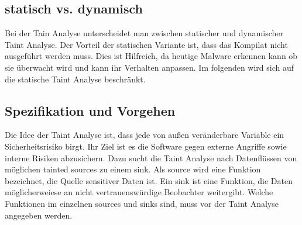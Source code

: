 \documentclass[runningheads]{llncs}
\begin{document}
\subsection{statisch vs. dynamisch}
Bei der Tain Analyse unterscheidet man zwischen statischer und dynamischer Taint Analyse. Der Vorteil der statischen Variante ist, dass das Kompilat nicht ausgeführt werden muss. Dies ist Hilfreich, da heutige Malware erkennen kann ob sie überwacht wird und kann ihr Verhalten anpassen. Im folgenden wird sich auf die statische Taint Analyse beschränkt.
\subsection{Spezifikation und Vorgehen}
Die Idee der Taint Analyse ist, dass jede von außen veränderbare Variable ein Sicherheitsrisiko birgt. Ihr Ziel ist es die Software gegen externe Angriffe sowie interne Risiken abzusichern. Dazu sucht die Taint Analyse nach Datenflüssen von möglichen tainted sources zu einem sink. Als source wird eine Funktion bezeichnet, die Quelle sensitiver Daten ist. Ein sink ist eine Funktion, die Daten möglicherweiese an nicht vertrauenswürdige Beobachter weitergibt. Welche Funktionen im einzelnen sources und sinks sind, muss vor der Taint Analyse angegeben werden.
\end{document}
